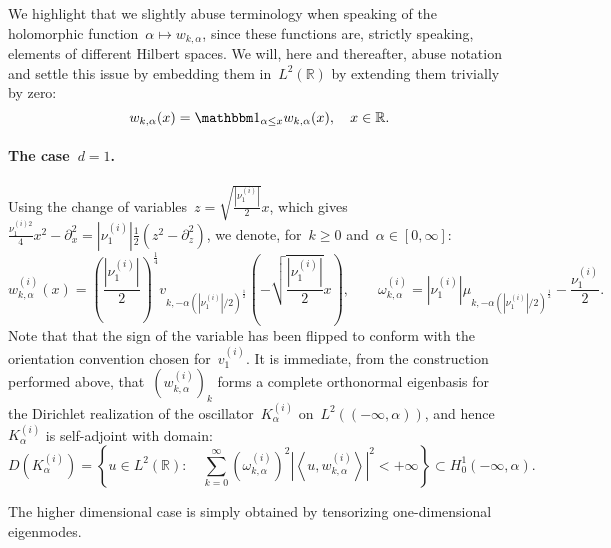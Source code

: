 \documentclass[10pt]{article}
\newcommand{\R}{\mathbb{R}}
\newcommand{\1}{\mathbbm 1}
\newcommand{\hessEigvec}[2]{v^{(#1)}_{#2}} %
\newcommand{\hessEigval}[2]{\nu^{(#1)}_{#2}} %
\newcommand{\Ki}[1]{K^{(i)}_{#1}}
\newcommand{\wi}[2]{w^{(i)}_{#1,#2}}
\newcommand{\omegai}[2]{\omega^{(i)}_{#1,#2}}
\begin{document}
    We highlight that we slightly abuse terminology when speaking of the holomorphic function~$\alpha\mapsto w_{k,\alpha}$, since these functions are, strictly speaking, elements of different Hilbert spaces. We will, here and thereafter, abuse notation and settle this issue by embedding them in~$L^2(\R)$ by extending them trivially by zero:
    \begin{equation}
        w_{k,\alpha}(x) = \1_{\alpha\leq x} w_{k,\alpha}(x),\quad x\in \R.
    \end{equation}

    \paragraph{The case~$d=1$.\newline}
    Using the change of variables~$z=\sqrt{\frac{|\nu_1^{(i)}|}2}x$, which gives~$\frac{\nu_1^{(i)2}}4 x^2-\partial_x^2 = |\nu_1^{(i)}|\frac12\left(z^2-\partial_z^2\right)$, we denote, for~$k\geq 0$ and~$\alpha\in [0,\infty]$:
    \begin{equation}
        \label{eq:hermite_eigenfunction_scaled}
        \wi{k}{\alpha}(x) = \left(\frac{|\nu_1^{(i)}|}{2}\right)^{\frac14}v_{k,-\alpha(|\hessEigval{i}{1}|/2)^{\frac12}}\left(-\sqrt{\frac{|\nu^{(i)}_1|}2}x\right) ,\qquad \omegai{k}{\alpha} = |\nu^{(i)}_1|\mu_{k,-\alpha(|\hessEigval{i}{1}|/2)^{\frac12}} - \frac{\nu^{(i)}_1}2.
    \end{equation}
    Note that that the sign of the variable has been flipped to conform with the orientation convention chosen for~$\hessEigvec{i}{1}$.
    It is immediate, from the construction performed above, that~$(\wi{k}{\alpha})_{k}$ forms a complete orthonormal eigenbasis for the Dirichlet realization of the oscillator~$\Ki{\alpha}$ on~$L^2((-\infty,\alpha))$, and hence~$\Ki{\alpha}$ is self-adjoint with domain:
        \begin{equation}
            \label{eq:full_oscillator_domain}
            D(\Ki{\alpha}) = \left\{ u \in L^2(\R):\quad \sum_{k=0}^\infty \left(\omegai{k}{\alpha}\right)^2\left|\left\langle u,\wi{k}{\alpha}\right\rangle\right|^2<+\infty\right\} \subset H_0^1(-\infty,\alpha).
        \end{equation}

    The higher dimensional case is simply obtained by tensorizing one-dimensional eigenmodes.
\end{document}
